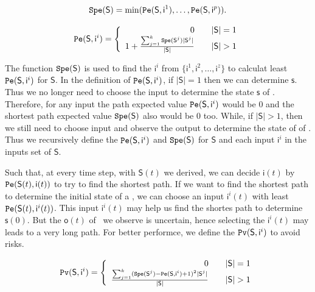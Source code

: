 \begin{definition} \label{lspe}
\begin{equation}
\begin{split}
{\tt Spe}(\mathsf{S})= \min({\tt Pe}(\mathsf{S}, \mathsf{ i}^{1}),\ldots,{\tt Pe}(\mathsf{S}, \mathsf{ i}^{p})).
\end{split}
\end{equation}
\end{definition}

\begin{definition} \label{spe}

\[\Pe(\mathsf{S}, \mathsf{ i}^{i})=\left\{
\begin{array}{rcl}
0      &      & {|\mathsf{S}|=1}\\
1 +\frac{\sum_{j=1}^k \Spe(\mathsf{S}^{j})|\mathsf{S}^{j}|}{ |\mathsf{S}|}       &      & {|\mathsf{S}|>1}
\end{array} \right. \]

\end{definition}

The function ${\tt Spe}(\mathsf{S})$ is used to find the $\mathsf{ i}^{i}$ from $\{\mathsf{ i}^{1},\mathsf{ i}^{2},\ldots, \mathsf{ i}^{z}\}$ to calculat least ${\tt Pe}(\mathsf{S}, \mathsf{ i}^{i})$ for $\mathsf{S}$. In the definition of ${\tt Pe}(\mathsf{S}, \mathsf{ i}^{i})$, if $|\mathsf{S}|=1$ then we can determine $\mathsf{s}$. Thus we no longer need to choose the input to determine the state $\mathsf{s}$ of \BCNs. Therefore, for any input the path expected value ${\tt Pe}(\mathsf{S}, \mathsf{ i}^{i})$ would be $0$ and the shortest path expected value ${\tt Spe}(\mathsf{S})$ also would be $0$ too. While, if $|\mathsf{S}|>1$, then we still need to choose input and observe the output to determine the state of of \BCNs. Thus we recursively define the ${\tt Pe}(\mathsf{S}, \mathsf{ i}^{i})$ and ${\tt Spe}(\mathsf{S})$ for $\mathsf{S}$ and each input $\mathsf{ i}^{i}$ in the inputs set of $\mathsf{S}$. 

Such that, at every time step, with $\mathsf{S}(t)$ we derived, we can decide $\mathsf{i}(t)$ by ${\tt Pe}(\mathsf{S}(t),\mathsf{ i}(t))$ to try to find the shortest path. If we want to find the shortest path to determine the initial state of a \BCN, we can choose an input $\mathsf{ i}^{i}(t)$ with least ${\tt Pe}(\mathsf{S}(t), \mathsf{ i}^{i}(t))$. This input $\mathsf{i}^{i}(t)$ may help us find the shortes path to determine $\mathsf{s}(0)$. But the $\mathsf{o}(t)$ of \BCNs\ we observe is uncertain, hence selecting the $\mathsf{ i}^{i}(t)$ may leads to a very long path. For better performce, we define the ${\tt Pv}(\mathsf{S}, \mathsf{ i}^{i})$ to avoid risks.
\begin{definition} 
\[\Pv(\mathsf{S}, \mathsf{ i}^{i})=\left\{
\begin{array}{rcl}
0      &      & {|\mathsf{S}|=1}\\
\frac{\sum_{j=1}^k (\Spe(\mathsf{S}^{j})-\Pe(\mathsf{S}, \mathsf{ i}^{i})+1)^2 |\mathsf{S}^{j}|}{ |\mathsf{S}|}      &      & {|\mathsf{S}|>1}
\end{array} \right. \]
\end{definition}

